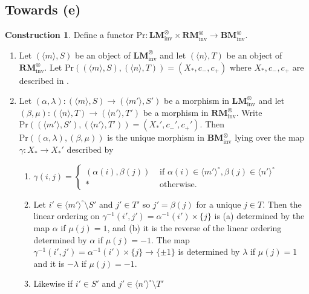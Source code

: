 \documentclass{article}
\theoremstyle{definition}
\newtheorem{construction}[equation]{Construction}
\begin{document}
\subsection{Towards (e)}
\begin{construction}
    Define a functor $ \mathrm{Pr}\colon \mathbf{LM}_{\mathrm{inv}}^\otimes \times \mathbf{RM}_{\mathrm{inv}}^\otimes \to \mathbf{BM}_{\mathrm{inv}}^\otimes $. 
\begin{enumerate}[label=(\arabic*)]
    \item Let $ (\langle m\rangle, S) $ be an object of $ \mathbf{LM}_{\mathrm{inv}}^\otimes $ and let $ ( \langle n \rangle, T) $ be an object of $ \mathbf{RM}_{\mathrm{inv}}^\otimes $. 
    Let $ \mathrm{Pr}((\langle m\rangle, S), (\langle n\rangle, T)) = (X_*, c_{-}, c_{+}) $ where $ X_*, c_{-}, c_{+} $ are described in \cite[Construction 4.3.2.1(1)]{LurHA}. 
    \item Let $ (\alpha, \lambda) \colon (\langle m\rangle, S) \to (\langle m'\rangle, S') $ be a morphism in $ \mathbf{LM}_{\mathrm{inv}}^\otimes $ and let $ (\beta, \mu) \colon (\langle n\rangle, T) \to (\langle n'\rangle, T') $ be a morphism in $ \mathbf{RM}_{\mathrm{inv}}^\otimes $. 
    Write $ \mathrm{Pr}((\langle m'\rangle, S'), (\langle n'\rangle, T')) = (X_*', c_{-}', c_{+}') $. 
    Then $ \mathrm{Pr}\left((\alpha, \lambda),(\beta, \mu)\right) $ is the unique morphism in $ \mathbf{BM}_{\mathrm{inv}}^\otimes $ lying over the map $ \gamma \colon X_* \to X_*' $ described by 
    \begin{enumerate}[label=(\roman*)]
        \item $ \displaystyle \gamma(i,j) = \begin{cases}
            (\alpha(i), \beta(j)) & \text{ if } \alpha(i) \in \langle m' \rangle^\circ, \beta(j) \in \langle n' \rangle^\circ \\
            * & \text{ otherwise. }
        \end{cases} $
        \item Let $ i' \in \langle m' \rangle^\circ \setminus S' $ and $ j' \in T' $ so $ j' = \beta(j) $ for a unique $ j \in T $. 
        Then the linear ordering on $ \gamma^{-1}(i', j') = \alpha^{-1}(i') \times \{j\} $ is (a) determined by the map $ \alpha $ if $ \mu(j) = 1 $, and (b) it is the reverse of the linear ordering determined by $ \alpha $ if $ \mu(j) = -1 $. 
        The map $ \gamma^{-1}(i', j') = \alpha^{-1}(i') \times \{j\} \to \{\pm 1\} $ is determined by $ \lambda $ if $ \mu(j) = 1 $ and it is $ -\lambda $ if $ \mu(j ) = -1 $. 
        \item Likewise if $ i' \in S' $ and $ j' \in \langle n' \rangle^\circ \setminus T' $ 

\end{enumerate}
\end{enumerate}
\end{construction}
\end{document}
